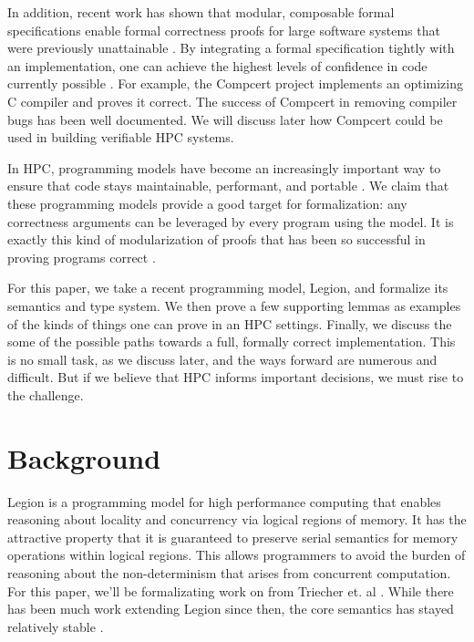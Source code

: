 \documentclass[sigconf]{acmart}
\begin{document}
In addition, recent work has shown that modular, composable formal
specifications enable formal correctness proofs for large software systems that
were previously unattainable \cite{weng2016deepspec}. By integrating a formal
specification tightly with an implementation, one can achieve the highest
levels of confidence in code currently possible \cite{weng2016deepspec}. For
example, the Compcert project implements an optimizing C compiler and proves it
correct. The success of Compcert in removing compiler bugs has been well
documented. We will discuss later how Compcert could be used in building
verifiable HPC systems.

In HPC, programming models have become an increasingly important way to ensure
that code stays maintainable, performant, and portable \cite{diaz2012survey}.
We claim that these programming models provide a good target for formalization:
any correctness arguments can be leveraged by every program using the model. It
is exactly this kind of modularization of proofs that has been so successful in
proving programs correct \cite{weng2016deepspec}.

For this paper, we take a recent programming model, Legion, and formalize its
semantics and type system. We then prove a few supporting lemmas as examples of
the kinds of things one can prove in an HPC settings. Finally, we discuss the
some of the possible paths towards a full, formally correct implementation.
This is no small task, as we discuss later, and the ways forward are numerous
and difficult. But if we believe that HPC informs important decisions, we must
rise to the challenge.

\section{Background}

Legion is a programming model for high performance computing that enables
reasoning about locality and concurrency via logical regions of memory. It has
the attractive property that it is guaranteed to preserve serial semantics for
memory operations within logical regions. This allows programmers to avoid the
burden of reasoning about the non-determinism that arises from concurrent
computation. For this paper, we'll be formalizating work on from Triecher et.
al \cite{treichler2013language}. While there has been much work extending
Legion since then, the core semantics has stayed relatively stable
\cite{slaughter2015regent, treichler2016dependent}. 
\end{document}
